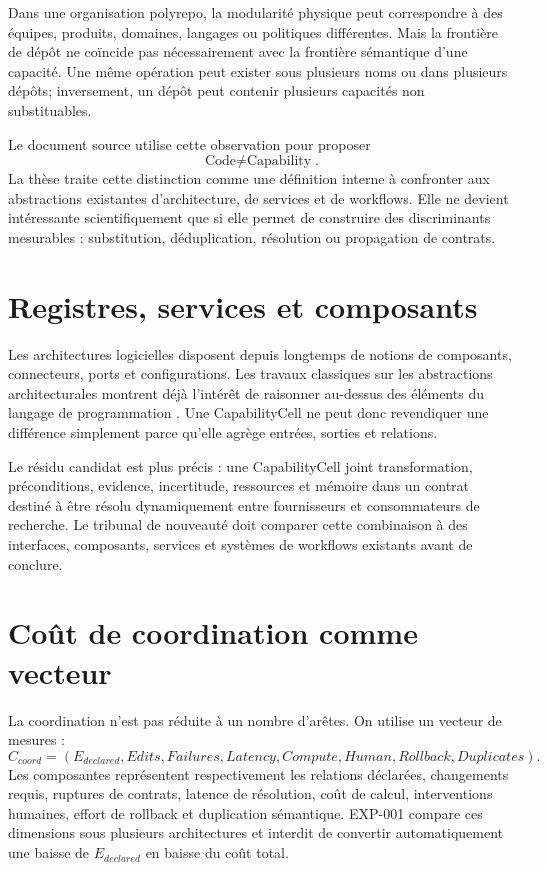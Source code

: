 Dans une organisation polyrepo, la modularité physique peut correspondre à des équipes, produits, domaines, langages ou politiques différentes. Mais la frontière de dépôt ne coïncide pas nécessairement avec la frontière sémantique d'une capacité. Une même opération peut exister sous plusieurs noms ou dans plusieurs dépôts; inversement, un dépôt peut contenir plusieurs capacités non substituables.

Le document source utilise cette observation pour proposer
\[
\boxed{\text{Code}\neq\text{Capability}}.
\]
La thèse traite cette distinction comme une définition interne à confronter aux abstractions existantes d'architecture, de services et de workflows. Elle ne devient intéressante scientifiquement que si elle permet de construire des discriminants mesurables : substitution, déduplication, résolution ou propagation de contrats.

\section{Registres, services et composants}

Les architectures logicielles disposent depuis longtemps de notions de composants, connecteurs, ports et configurations. Les travaux classiques sur les abstractions architecturales montrent déjà l'intérêt de raisonner au-dessus des éléments du langage de programmation \cite{shaw1995architecture}. Une CapabilityCell ne peut donc revendiquer une différence simplement parce qu'elle agrège entrées, sorties et relations.

Le résidu candidat est plus précis : une CapabilityCell joint transformation, préconditions, evidence, incertitude, ressources et mémoire dans un contrat destiné à être résolu dynamiquement entre fournisseurs et consommateurs de recherche. Le tribunal de nouveauté doit comparer cette combinaison à des interfaces, composants, services et systèmes de workflows existants avant de conclure.

\section{Coût de coordination comme vecteur}

La coordination n'est pas réduite à un nombre d'arêtes. On utilise un vecteur de mesures :
\[
C_{coord}=(E_{declared},Edits,Failures,Latency,Compute,Human,Rollback,Duplicates).
\]
Les composantes représentent respectivement les relations déclarées, changements requis, ruptures de contrats, latence de résolution, coût de calcul, interventions humaines, effort de rollback et duplication sémantique. EXP-001 compare ces dimensions sous plusieurs architectures et interdit de convertir automatiquement une baisse de $E_{declared}$ en baisse du coût total.

